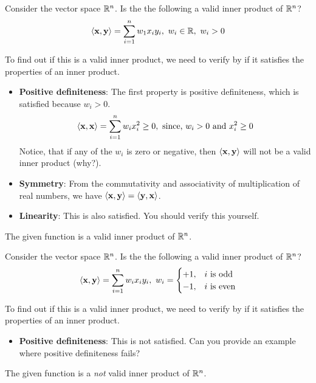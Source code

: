 \begin{boxedstuff}
\begin{problem}
    Consider the vector space $\mathbb{R}^n$. Is the the following a valid inner product of $\mathbb{R}^n$?
    \[ \langle \mathbf{x}, \mathbf{y}\rangle = \sum_{i=1}^n w_1 x_i y_i, \,\, w_i \in \mathbb{R}, \,\, w_i > 0 \]
    \begin{solution}
        To find out if this is a valid inner product, we need to verify by if it satisfies the properties of an inner product. 
        \begin{itemize}
            \item \textbf{Positive definiteness}: The first property is positive definiteness, which is satisfied because $w_i > 0$.
            \[ \langle \mathbf{x}, \mathbf{x} \rangle = \sum_{i=1}^n w_i x_i^2 \geq 0, \,\, \text{since, } w_i > 0 \text{ and } x_i^2 \geq 0 \]
            Notice, that if any of the $w_i$ is zero or negative, then $\langle \mathbf{x}, \mathbf{y} \rangle$ will not be a valid inner product (why?).
            \item \textbf{Symmetry}: From the commutativity and associativity of multiplication of real numbers, we have $\langle \mathbf{x}, \mathbf{y} \rangle = \langle \mathbf{y}, \mathbf{x} \rangle$. 
        
            \item\textbf{Linearity}: This is also satisfied. You should verify this yourself.
        \end{itemize}
        The given function is a valid inner product of $\mathbb{R}^n$.
    \end{solution}
\end{problem}
\begin{problem}
    Consider the vector space $\mathbb{R}^n$. Is the the following a valid inner product of $\mathbb{R}^n$?
    \[ \langle \mathbf{x}, \mathbf{y}\rangle = \sum_{i=1}^n w_i x_i y_i, \,\, w_i = \begin{cases} +1, & i \text{ is odd} \\  -1, & i \text{ is even}\end{cases} \]
    \begin{solution}
        To find out if this is a valid inner product, we need to verify by if it satisfies the properties of an inner product. 
        \begin{itemize}
            \item \textbf{Positive definiteness}: This is not satisfied. Can you provide an example where positive definiteness fails?
        \end{itemize}
        The given function is a \textit{not} valid inner product of $\mathbb{R}^n$.
    \end{solution}
\end{problem}
\end{boxedstuff}

